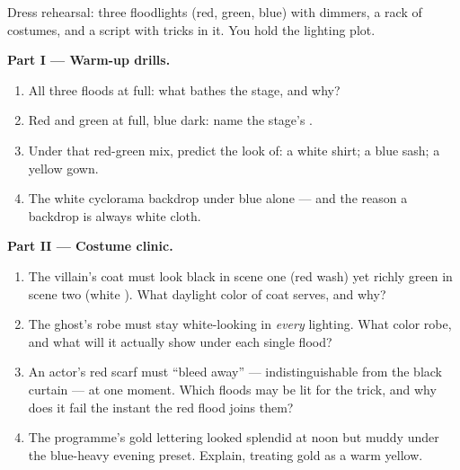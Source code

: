 \begin{problem}\label{pb:g8:colors-spectra:1}
Dress rehearsal: three floodlights (red, green, blue) with
dimmers, a rack of costumes, and a script with tricks in it.
You hold the lighting plot.

\medskip\noindent\textbf{Part I --- Warm-up drills.}
\begin{enumerate}
  \item All three floods at full: what  bathes the stage,
        and why?
  \item Red and green at full, blue dark: name the stage's
        .
  \item Under that red-green mix, predict the look of: a white
        shirt; a blue sash; a yellow gown.
  \item The white cyclorama backdrop under blue alone ---
        and the reason a backdrop is always white cloth.
\end{enumerate}

\medskip\noindent\textbf{Part II --- Costume clinic.}
\begin{enumerate}[resume]
  \item The villain's coat must look black in scene one (red
        wash) yet richly green in scene two (white ).
        What daylight color of coat serves, and why?
  \item The ghost's robe must stay white-looking in
        \emph{every} lighting. What color robe, and what will
        it actually show under each single flood?
  \item An actor's red scarf must ``bleed away'' ---
        indistinguishable from the black curtain --- at one
        moment. Which floods may be lit for the trick, and why
        does it fail the instant the red flood joins them?
  \item The programme's gold lettering looked splendid at
        noon but muddy under the blue-heavy evening preset.
        Explain, treating gold as a warm yellow.
\end{enumerate}


\end{problem}
